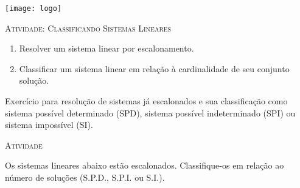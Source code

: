 \documentclass[10 pt,usenames,dvipsnames, oneside]{article}
\begin{document}
\begin{center}
  \begin{minipage}[l]{3cm}
\texttt{[image: logo]}    
\end{minipage}\hfill
\begin{minipage}[r]{.8\textwidth}
 {\Large \scshape Atividade: Classificando Sistemas Lineares}  
\end{minipage}
\end{center}
\vspace{.2cm}

\ifdefined\prof

\begin{goals}
\begin{enumerate}
\item Resolver um sistema linear por escalonamento.
\item Classificar um sistema linear em relação à cardinalidade de seu conjunto solução.
\end{enumerate}

\tcblower

Exercício para resolução de sistemas já escalonados e sua classificação como sistema possível determinado (SPD), sistema possível indeterminado (SPI) ou sistema impossível (SI).
\end{goals}

\bigskip
\begin{center}
{\large \scshape Atividade}
\end{center}
\fi

Os sistemas lineares abaixo estão escalonados. Classifique-os em relação ao número de soluções (S.P.D., S.P.I. ou S.I.).
\end{document}
